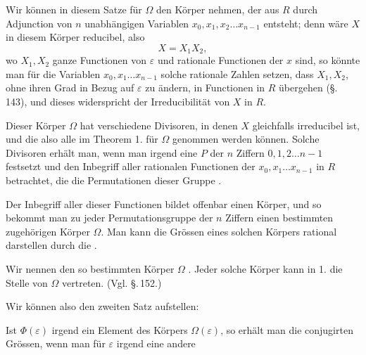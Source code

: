 
Wir können in diesem Satze für $\Omega$ den Körper nehmen, der aus $R$ durch Adjunction von $n$ unabhängigen Variablen $x_0, x_1, x_2 \ldots x_{n-1}$ entsteht; denn wäre $X$ in diesem Körper reducibel, also
\[
X = X_1 X_2,
\]
wo $X_1, X_2$ ganze Functionen von $\varepsilon$ und rationale Functionen der $x$ sind, so könnte man für die Variablen $x_0, x_1 \ldots x_{n-1}$ solche rationale Zahlen setzen, dass $X_1, X_2$, ohne ihren Grad in Bezug auf $\varepsilon$ zu ändern, in Functionen in $R$ übergehen (\S.\,143), und dieses widerspricht der Irreducibilität von $X$ in $R$.

Dieser Körper $\Omega$ hat verschiedene Divisoren, in denen $X$ gleichfalls irreducibel ist, und die also alle im Theorem 1. für $\Omega$ genommen werden können. Solche Divisoren erhält man, wenn man irgend eine  $P$ der $n$ Ziffern $0, 1, 2 \ldots n-1$ festsetzt und den Inbegriff aller rationalen Functionen der $x_0, x_1 \ldots x_{n-1}$ in $R$ betrachtet, die die Permutationen dieser Gruppe .

Der Inbegriff aller dieser Functionen bildet offenbar einen Körper, und so bekommt man zu jeder Permutationsgruppe der $n$ Ziffern einen bestimmten zugehörigen Körper $\Omega$. Man kann die Grössen eines solchen Körpers rational darstellen durch die .

Wir nennen den so bestimmten Körper $\Omega$ . Jeder solche Körper kann in 1. die Stelle von $\Omega$ vertreten. (Vgl. \S.\,152.)

Wir können also den zweiten Satz aufstellen:


Ist $\Phi(\varepsilon)$ irgend ein Element des Körpers $\Omega(\varepsilon)$, so erhält man die conjugirten Grössen, wenn man für $\varepsilon$ irgend eine andere
